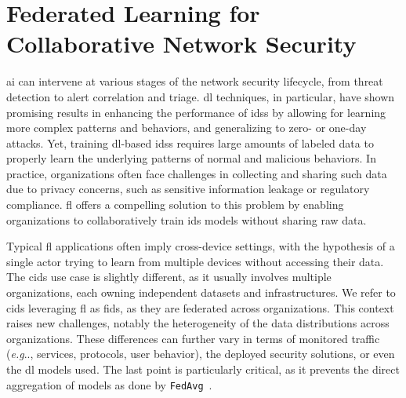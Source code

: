 \documentclass[conference]{IEEEtran}
\makeatletter
\DeclareRobustCommand\onedot{\futurelet\@let@token\@onedot}
\def\@onedot{\ifx\@let@token.\else.\null\fi\xspace}
\def\eg{\emph{e.g}\onedot} \def\Eg{\emph{E.g}\onedot}
\makeatother
\begin{document}
\section{Federated Learning for Collaborative Network Security} %
\label{sec:fids}


\Gls{ai} can intervene at various stages of the network security lifecycle, from threat detection to alert correlation and triage.
\Gls{dl} techniques, in particular, have shown promising results in enhancing the performance of \glspl{ids} by allowing for learning more complex patterns and behaviors, and generalizing to zero- or one-day attacks.
Yet, training \gls{dl}-based \glspl{ids} requires large amounts of labeled data to properly learn the underlying patterns of normal and malicious behaviors.
In practice, organizations often face challenges in collecting and sharing such data due to privacy concerns, such as sensitive information leakage or regulatory compliance.
\Gls{fl} offers a compelling solution to this problem by enabling organizations to collaboratively train \gls{ids} models without sharing raw data.

Typical \gls{fl} applications often imply cross-device settings, with the hypothesis of a single actor trying to learn from multiple devices without accessing their data.
The \gls{cids} use case is slightly different, as it usually involves multiple organizations, each owning independent datasets and infrastructures.
We refer to \gls{cids} leveraging \gls{fl} as \gls{fids}, as they are federated across organizations.
%
This context raises new challenges, notably the heterogeneity of the data distributions across organizations.
These differences can further vary in terms of monitored traffic (\eg, services, protocols, user behavior), the deployed security solutions, or even the \gls{dl} models used.
The last point is particularly critical, as it prevents the direct aggregation of models as done by \texttt{FedAvg}~\cite{mcmahan_communication-efficient_2017}.
\end{document}
